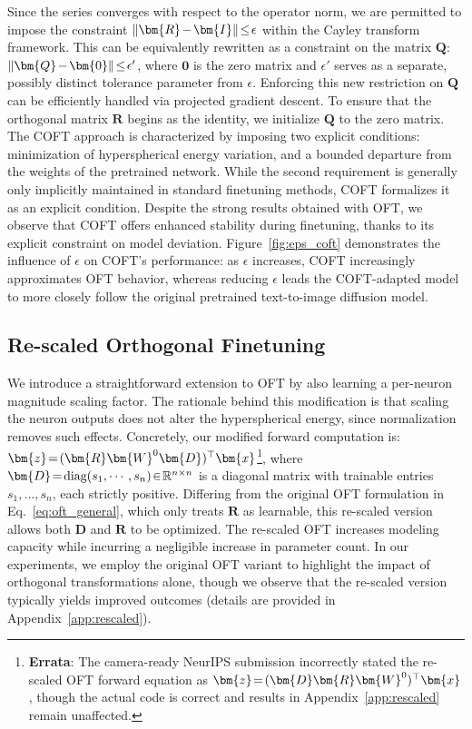 {Since the series converges with respect to the operator norm, we are permitted to impose the constraint $\thickmuskip=2mu \medmuskip=2mu\|\bm{R}-\bm{I}\|\leq\epsilon$ within the Cayley transform framework. This can be equivalently rewritten as a constraint on the matrix $\bm{Q}$: $\thickmuskip=2mu \medmuskip=2mu \|\bm{Q}-\bm{0}\|\leq\epsilon'$, where $\bm{0}$ is the zero matrix and $\epsilon'$ serves as a separate, possibly distinct tolerance parameter from $\epsilon$. Enforcing this new restriction on $\bm{Q}$ can be efficiently handled via projected gradient descent. To ensure that the orthogonal matrix $\bm{R}$ begins as the identity, we initialize $\bm{Q}$ to the zero matrix. The COFT approach is characterized by imposing two explicit conditions: minimization of hyperspherical energy variation, and a bounded departure from the weights of the pretrained network. While the second requirement is generally only implicitly maintained in standard finetuning methods, COFT formalizes it as an explicit condition. Despite the strong results obtained with OFT, we observe that COFT offers enhanced stability during finetuning, thanks to its explicit constraint on model deviation. Figure~\ref{fig:eps_coft} demonstrates the influence of $\epsilon$ on COFT's performance: as $\epsilon$ increases, COFT increasingly approximates OFT behavior, whereas reducing $\epsilon$ leads the COFT-adapted model to more closely follow the original pretrained text-to-image diffusion model.

\subsection{Re-scaled Orthogonal Finetuning}

We introduce a straightforward extension to OFT by also learning a per-neuron magnitude scaling factor. The rationale behind this modification is that scaling the neuron outputs does not alter the hyperspherical energy, since normalization removes such effects. Concretely, our modified forward computation is: $\thickmuskip=2mu \medmuskip=2mu\bm{z}=(\bm{R}\bm{W}^0\bm{D})^\top\bm{x}$\footnote{\textbf{Errata}: The camera-ready NeurIPS submission incorrectly stated the re-scaled OFT forward equation as $\thickmuskip=2mu \medmuskip=2mu\bm{z}=(\bm{D}\bm{R}\bm{W}^0)^\top\bm{x}$, though the actual code is correct and results in Appendix~\ref{app:rescaled} remain unaffected.}, where $\thickmuskip=2mu \medmuskip=2mu \bm{D}=\text{diag}(s_1,\cdots,s_n)\in\mathbb{R}^{n\times n}$ is a diagonal matrix with trainable entries $s_1,\dots, s_n$, each strictly positive. Differing from the original OFT formulation in Eq.~\eqref{eq:oft_general}, which only treats $\bm{R}$ as learnable, this re-scaled version allows both $\bm{D}$ and $\bm{R}$ to be optimized. The re-scaled OFT increases modeling capacity while incurring a negligible increase in parameter count. In our experiments, we employ the original OFT variant to highlight the impact of orthogonal transformations alone, though we observe that the re-scaled version typically yields improved outcomes (details are provided in Appendix~\ref{app:rescaled}).

}

